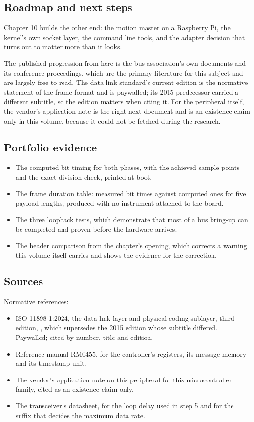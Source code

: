 \subsection*{Roadmap and next steps}

Chapter 10 builds the other end: the motion master on a Raspberry Pi, the
kernel's own socket layer, the command line tools, and the adapter decision that
turns out to matter more than it looks.

The published progression from here is the bus association's own documents and
its conference proceedings, which are the primary literature for this subject
and are largely free to read. The data link standard's current edition is the
normative statement of the frame format and is paywalled; its 2015 predecessor
carried a different subtitle, so the edition matters when citing it. For the
peripheral itself, the vendor's application note is the right next document and
is an existence claim only in this volume, because it could not be fetched
during the research.

\subsection*{Portfolio evidence}

\begin{itemize}
\item The computed bit timing for both phases, with the achieved sample points
and the exact-division check, printed at boot.
\item The frame duration table: measured bit times against computed ones for
five payload lengths, produced with no instrument attached to the board.
\item The three loopback tests, which demonstrate that most of a bus bring-up
can be completed and proven before the hardware arrives.
\item The header comparison from the chapter's opening, which corrects a warning
this volume itself carries and shows the evidence for the correction.
\end{itemize}

\subsection*{Sources}

Normative references:
\begin{itemize}
\item ISO 11898-1:2024, the data link layer and physical coding sublayer, third
edition, , which supersedes the 2015 edition whose subtitle differed.
Paywalled; cited by number, title and edition.
\item Reference manual RM0455, for the controller's registers, its message
memory and its timestamp unit.
\item The vendor's application note on this peripheral for this microcontroller
family, cited as an existence claim only.
\item The transceiver's datasheet, for the loop delay used in step 5 and for the
suffix that decides the maximum data rate.
\end{itemize}

